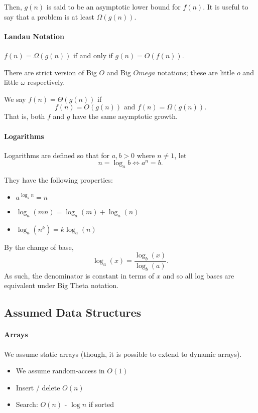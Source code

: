 Then, \(g(n)\) is said to be an asymptotic lower bound for \(f(n)\).
It is useful to say that a problem is at least \(\Omega(g(n))\).

\paragraph{Landau Notation}
\(f(n) = \Omega (g(n))\) if and only if \(g(n) = O(f(n))\).

There are strict version of Big \(O\) and Big \(Omega\) notations; these
are little \(o\) and little \(\omega\) respectively.

We say \(f(n) = \Theta(g(n))\) if
\[
    f(n) = O(g(n)) \text{ and } f(n) = \Omega(g(n)).
\]
That is, both \(f\) and \(g\) have the same asymptotic growth.


\paragraph{Logarithms}
Logarithms are defined so that for \(a, b > 0\) where \(n \neq 1\),
let \[ n = \log_a b \Leftrightarrow a^n = b.\]

They have the following properties:
\begin{itemize}
    \item \(a^{\log_a n} = n\)
    \item \(\log_a (mn) = \log_a (m) + \log_a(n)\)
    \item \(\log_a (n^k) = k\log_a (n)\)
\end{itemize}

By the change of base,
\[
    \log_a(x) = \frac{\log_b (x)}{\log_b (a)}.
\]
As such, the denominator is constant in terms of \(x\) and so all log bases are equivalent under Big Theta notation.

\subsection{Assumed Data Structures}

\paragraph{Arrays}
We assume static arrays (though, it is possible to extend to dynamic arrays).

\begin{itemize}
    \item We assume random-access in \(O(1)\)
    \item Insert / delete \(O(n)\)
    \item Search: \(O(n)\) - \(\log n\) if sorted
\end{itemize}

